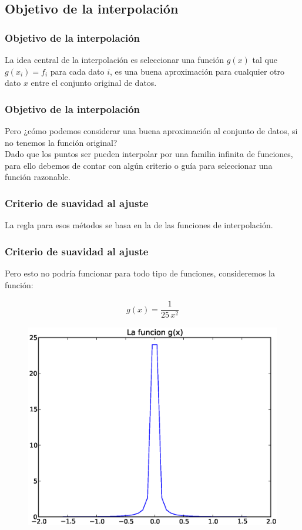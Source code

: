 \documentclass[12pt]{beamer}
\begin{document}
\subsection{Objetivo de la interpolación}

\begin{frame}
\frametitle{Objetivo de la interpolación}
La idea central de la interpolación es seleccionar una función $g (x)$ tal que $g (x_{i}) = f_{i}$ para cada dato $i$, es una buena aproximación para cualquier otro dato $x$ entre el conjunto original de datos.
\end{frame}
\begin{frame}
\frametitle{Objetivo de la interpolación}
Pero ¿cómo podemos considerar una buena aproximación al conjunto de datos, si no tenemos la función original?
\\
\bigskip
\pause
Dado que los puntos ser pueden interpolar por una familia infinita de funciones, para ello debemos de contar con algún criterio o guía para seleccionar una función razonable.
\end{frame}
\begin{frame}
\frametitle{Criterio de suavidad al ajuste}
La regla para esos métodos se basa en la  de las funciones de interpolación.
\end{frame}
\begin{frame}
\frametitle{Criterio de suavidad al ajuste}
Pero esto no podría funcionar para todo tipo de funciones, consideremos la función:
\\
\medskip
\pause
\begin{minipage}{3cm}
\begin{align*}
g(x) = \dfrac{1}{25 \, x^{2}}
\end{align*}
\end{minipage}
\hspace{0.5cm}
\begin{minipage}{6cm}
\begin{figure}
	\centering
	 \includegraphics[scale=0.28]{Imagenes/grafica02.eps}  
\end{figure}
\end{minipage}
\end{frame}
\end{document}
